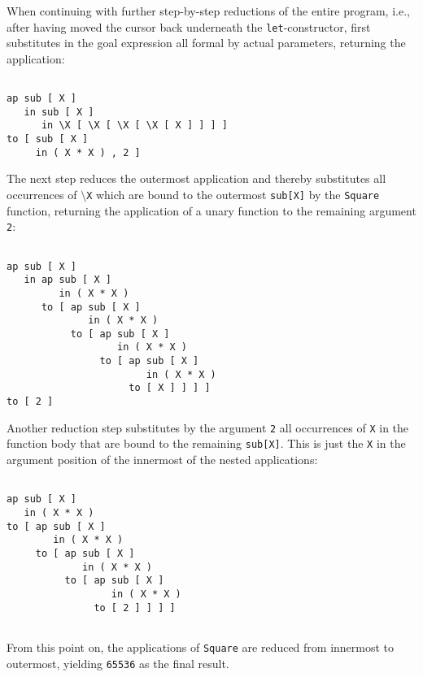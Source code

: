 When continuing with further step-by-step reductions of the entire
program, i.e., after having moved the cursor back underneath the
{\tt let}-constructor, \pired first
substitutes in the goal expression all formal by actual parameters,
returning the application: 
\begin{verbatim}

ap sub [ X ]
   in sub [ X ]
      in \X [ \X [ \X [ \X [ X ] ] ] ]
to [ sub [ X ]
     in ( X * X ) , 2 ]

\end{verbatim}
The next step reduces the outermost application and thereby substitutes
all occurrences of {\tt $\setminus$X} which are bound to the outermost {\tt sub[X]}
by the {\tt Square} function, returning the application of a unary
function to the remaining argument {\tt 2}:
\begin{verbatim}

ap sub [ X ]
   in ap sub [ X ]
         in ( X * X )
      to [ ap sub [ X ]
              in ( X * X )
           to [ ap sub [ X ]
                   in ( X * X )
                to [ ap sub [ X ]
                        in ( X * X )
                     to [ X ] ] ] ]
to [ 2 ]

\end{verbatim}
Another reduction step substitutes by the argument {\tt 2}
 all occurrences of {\tt X} in the function body that are bound
to the remaining {\tt sub[X]}. This is just the {\tt X} in the argument
position of the innermost of the nested applications:
\begin{verbatim} 

ap sub [ X ]
   in ( X * X )
to [ ap sub [ X ]
        in ( X * X )
     to [ ap sub [ X ]
             in ( X * X )
          to [ ap sub [ X ]
                  in ( X * X )
               to [ 2 ] ] ] ]


\end{verbatim}
From this point on, the applications of {\tt Square} are reduced 
from innermost to outermost, yielding {\tt 65536} as the final result.

